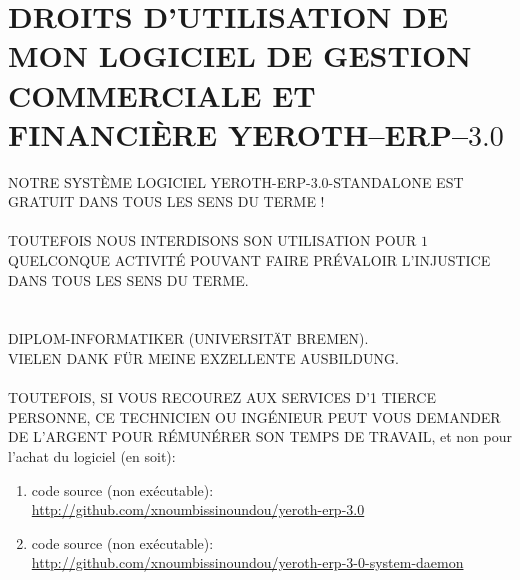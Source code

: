 \chapter{DROITS D'UTILISATION DE MON LOGICIEL DE GESTION 
  COMMERCIALE ET FINANCI\`ERE YEROTH--ERP--$3.0$}


\textcolor{yerothColorRed}{NOTRE SYST\`EME LOGICIEL
YEROTH-ERP-3.0-STANDALONE EST GRATUIT DANS TOUS LES
SENS DU TERME !\\
\\
TOUTEFOIS NOUS INTERDISONS SON UTILISATION POUR
$1$ QUELCONQUE ACTIVIT\'E POUVANT FAIRE PR\'EVALOIR
L'INJUSTICE DANS TOUS LES SENS DU TERME.\\
\\
\\
DIPLOM-INFORMATIKER (UNIVERSITÄT BREMEN).\\
VIELEN DANK FÜR MEINE EXZELLENTE AUSBILDUNG}.\\
\\

TOUTEFOIS, SI VOUS RECOUREZ AUX SERVICES D'1 TIERCE
PERSONNE, CE TECHNICIEN OU ING\'ENIEUR PEUT VOUS
DEMANDER DE L'ARGENT POUR R\'EMUN\'ERER SON TEMPS DE
TRAVAIL, et non pour l'achat du logiciel (en soit):

\begin{enumerate}[1.]
	\item code source (non ex\'ecutable): \\
		{\small \url{http://github.com/xnoumbissinoundou/yeroth-erp-3.0}}
		
	\item code source (non ex\'ecutable): \\
		{\small \url{http://github.com/xnoumbissinoundou/yeroth-erp-3-0-system-daemon}}
\end{enumerate}



\newpage
